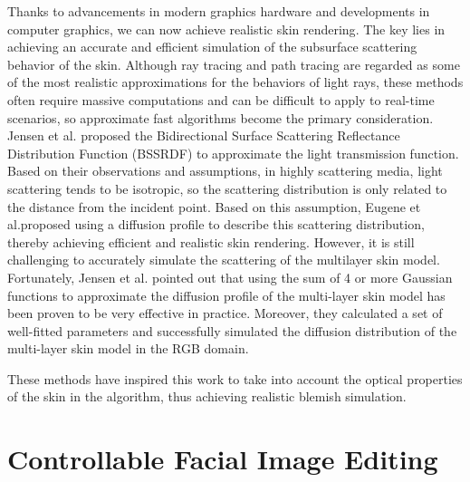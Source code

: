 \begin{spacing}{1.5}
Thanks to advancements in modern graphics hardware and developments in computer graphics, we can now achieve realistic skin rendering\cite{10.1145/1198555.1198593, 2015ExtendingTD, JIMENEZ2015_CGF}. The key lies in achieving an accurate and efficient simulation of the subsurface scattering behavior of the skin. Although ray tracing and path tracing\cite{wrenninge2017path, chiang2016practical} are regarded as some of the most realistic approximations for the behaviors of light rays, these methods often require massive computations and can be difficult to apply to real-time scenarios, so approximate fast algorithms become the primary consideration. Jensen et al.\cite{10.1145/3596711.3596747} proposed the Bidirectional Surface Scattering Reflectance Distribution Function (BSSRDF) to approximate the light transmission function. Based on their observations and assumptions, in highly scattering media, light scattering tends to be isotropic, so the scattering distribution is only related to the distance from the incident point. Based on this assumption, Eugene et al.\cite{d2007efficient}proposed using a diffusion profile to describe this scattering distribution, thereby achieving efficient and realistic skin rendering. However, it is still challenging to accurately simulate the scattering of the multilayer skin model. Fortunately, Jensen et al.\cite{10.1145/1073204.1073308} pointed out that using the sum of 4 or more Gaussian functions to approximate the diffusion profile of the multi-layer skin model has been proven to be very effective in practice. Moreover, they calculated a set of well-fitted parameters and successfully simulated the diffusion distribution of the multi-layer skin model in the RGB domain.

These methods have inspired this work to take into account the optical properties of the skin in the algorithm, thus achieving realistic blemish simulation.

\section{Controllable Facial Image Editing}



\end{spacing}
